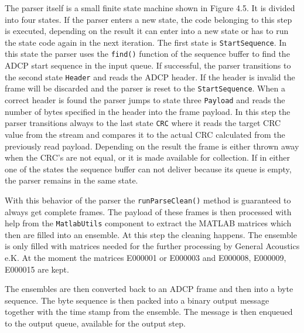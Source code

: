 The parser itself is a small finite state machine shown in Figure 4.5. It is divided into four states. If the parser enters a new state, the code belonging to this step is executed, depending on the result it can enter into a new state or has to run the state code again in the next iteration. The first state is \texttt{StartSequence}. In this state the parser uses the \texttt{find()} function of the sequence buffer to find the ADCP start sequence in the input queue. If successful, the parser transitions to the second state \texttt{Header} and reads the ADCP header. If the header is invalid the frame will be discarded and the parser is reset to the \texttt{StartSequence}. When a correct header is found the parser jumps to state three \texttt{Payload} and reads the number of bytes specified in the header into the frame payload. In this step the parser transitions always to the last state \texttt{CRC} where it reads the target CRC value from the stream and compares it to the actual CRC calculated from the previously read payload. Depending on the result the frame is either thrown away when the CRC's are not equal, or it is made available for collection. If in either one of the states the sequence buffer can not deliver because its queue is empty, the parser remains in the same state.

With this behavior of the parser the \texttt{runParseClean()} method is guaranteed to always get complete frames. The payload of these frames is then processed with help from the \texttt{MatlabUtils} component to extract the MATLAB matrices which then are filled into an ensemble. At this step the cleaning happens. The ensemble is only filled with matrices needed for the further processing by General Acoustics e.K. At the moment the matrices E000001 or E000003 and E000008, E000009, E000015 are kept.

The ensembles are then converted back to an ADCP frame and then into a byte sequence. The byte sequence is then packed into a binary output message together with the time stamp from the ensemble. The message is then enqueued to the output queue, available for the output step.

\pagebreak

